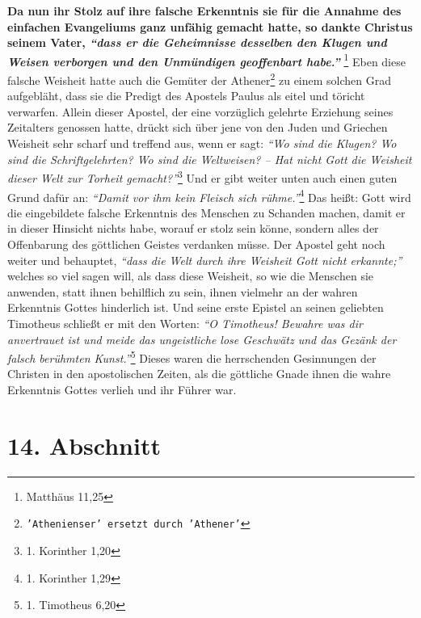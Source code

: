 \label{ref:07_13_gelehrte}
\textbf{Da nun ihr Stolz auf ihre falsche Erkenntnis
sie für die Annahme des einfachen
Evangeliums ganz unfähig gemacht hatte, so dankte Christus seinem Vater,
\textit{"`dass er die Geheimnisse desselben den Klugen und Weisen verborgen und
den Unmündigen geoffenbart habe."'}}
\footnote{Matthäus 11,25}
Eben diese falsche Weisheit hatte
auch die Gemüter der
Athener\footnote{\texttt{'Athenienser' ersetzt durch
'Athener'}} zu einem solchen Grad
aufgebläht, dass sie
die Predigt des Apostels Paulus als eitel und töricht
verwarfen. Allein dieser
Apostel, der eine vorzüglich gelehrte Erziehung seines Zeitalters genossen
hatte, drückt sich über jene von den Juden und
Griechen
Weisheit sehr scharf und treffend aus, wenn er sagt:
\textit{"`Wo sind die Klugen? Wo
sind die Schriftgelehrten? Wo sind die Weltweisen? -- Hat nicht Gott die
Weisheit dieser Welt zur Torheit gemacht?"'}\footnote{1. Korinther 1,20}
Und er
gibt weiter unten auch einen guten Grund dafür an:
\textit{"`Damit vor ihm kein Fleisch sich rühme."'}\footnote{1. Korinther 1,29}
Das heißt: Gott wird die eingebildete
falsche Erkenntnis des Menschen zu Schanden machen, damit er in dieser Hinsicht
nichts habe, worauf er stolz sein könne, sondern alles der
Offenbarung des
göttlichen Geistes verdanken müsse. Der Apostel geht noch weiter und behauptet,
\textit{"`dass die Welt durch ihre Weisheit Gott nicht erkannte;"'}
welches so viel sagen
will, als dass diese Weisheit, so wie die Menschen sie anwenden, statt ihnen
behilflich zu sein, ihnen vielmehr an der wahren Erkenntnis Gottes hinderlich
ist. Und seine erste Epistel an seinen geliebten Timotheus schließt er mit den
Worten:
\textit{"`O Timotheus! Bewahre was dir anvertrauet ist und meide das
ungeistliche lose Geschwätz und das Gezänk der falsch berühmten
Kunst."'}\footnote{1. Timotheus 6,20}
Dieses waren die herrschenden Gesinnungen der
Christen in den apostolischen Zeiten, als die göttliche Gnade ihnen die wahre
Erkenntnis Gottes verlieh und ihr Führer war.

\section{14. Abschnitt} \label{kap7_ab14}

